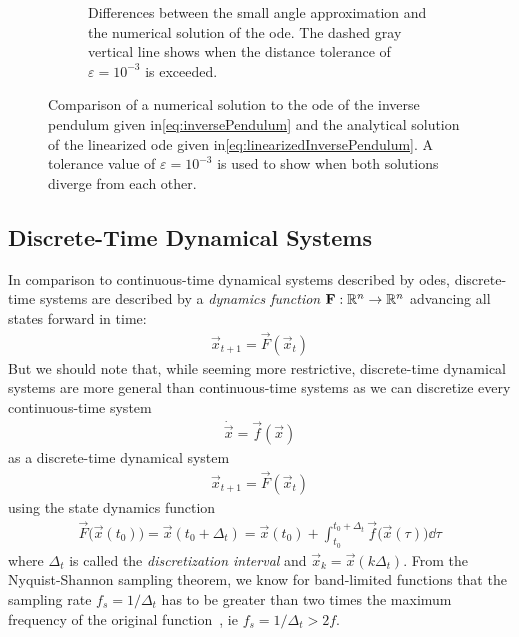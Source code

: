 \begin{figure}
\begin{subfigure}[t]{0.5\linewidth}
				\caption{Differences between the small angle approximation and the numerical solution of the \ac{ode}. The dashed gray vertical line shows when the distance tolerance of \( \varepsilon = 10^{-3} \) is exceeded.}
			\end{subfigure}
			\caption{Comparison of a numerical solution to the \ac{ode} of the inverse pendulum given in\eqref{eq:inversePendulum} and the analytical solution of the linearized \ac{ode} given in\eqref{eq:linearizedInversePendulum}. A tolerance value of \( \varepsilon = 10^{-3} \) is used to show when both solutions diverge from each other.}
			\label{fig:inversePendulumApprox}
		\end{figure}

	\subsection{Discrete-Time Dynamical Systems}
		In comparison to continuous-time dynamical systems described by \acp{ode}, discrete-time systems are described by a \emph{dynamics function} \( \boldsymbol{\mathrm{F}} : \mathbb{R}^n \to \mathbb{R}^n \) advancing all states forward in time:
		\begin{align*}
			\vec{x}_{t + 1} = \vec{F}(\vec{x}_t)
		\end{align*}
		But we should note that, while seeming more restrictive, discrete-time dynamical systems are more general than continuous-time systems as we can discretize every continuous-time system
		\begin{align*}
			\dot{\vec{x}} = \vec{f}(\vec{x})
		\end{align*}
		as a discrete-time dynamical system
		\begin{align*}
			\vec{x}_{t + 1} = \vec{F}(\vec{x}_t)
		\end{align*}
		using the state dynamics function
		\begin{align*}
			\vec{F}\big(\vec{x}(t_0)\big) = \vec{x}(t_0 + \Delta_t) = \vec{x}(t_0) + \int_{t_0}^{t_0 + \Delta_t} \! \vec{f}\big(\vec{x}(\tau)\big) \dd{\tau}
		\end{align*}
		where \( \Delta_t \) is called the \emph{discretization interval} and \( \vec{x}_k = \vec{x}(k \Delta_t) \). From the Nyquist-Shannon sampling theorem, we know for band-limited functions that the sampling rate \( f_s = 1/\Delta_t \) has to be greater than two times the maximum frequency of the original function~\cite{shannonCommunicationPresenceNoise1949}, \ac{ie} \( f_s = 1/\Delta_t > 2 f \).
